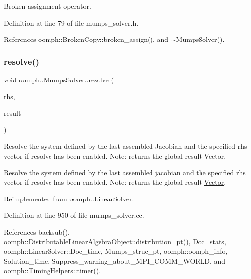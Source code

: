 Broken assignment operator. 



Definition at line 79 of file mumps\+\_\+solver.\+h.



References oomph\+::\+Broken\+Copy\+::broken\+\_\+assign(), and $\sim$\+Mumps\+Solver().

\mbox{\label{classoomph_1_1MumpsSolver_a849d13cac2177452446c2ec387a0260f}} 
\subsubsection{\texorpdfstring{resolve()}{resolve()}}
{\footnotesize\ttfamily void oomph\+::\+Mumps\+Solver\+::resolve (\begin{DoxyParamCaption}\item[{const \hyperlink{classoomph_1_1DoubleVector}{Double\+Vector} \&}]{rhs,  }\item[{\hyperlink{classoomph_1_1DoubleVector}{Double\+Vector} \&}]{result }\end{DoxyParamCaption})\hspace{0.3cm}{\ttfamily [virtual]}}



Resolve the system defined by the last assembled Jacobian and the specified rhs vector if resolve has been enabled. Note\+: returns the global result \hyperlink{classoomph_1_1Vector}{Vector}. 

Resolve the system defined by the last assembled jacobian and the specified rhs vector if resolve has been enabled. Note\+: returns the global result \hyperlink{classoomph_1_1Vector}{Vector}. 

Reimplemented from \hyperlink{classoomph_1_1LinearSolver_a3b310d08333033edc119b2a5bd7dcbfb}{oomph\+::\+Linear\+Solver}.



Definition at line 950 of file mumps\+\_\+solver.\+cc.



References backsub(), oomph\+::\+Distributable\+Linear\+Algebra\+Object\+::distribution\+\_\+pt(), Doc\+\_\+stats, oomph\+::\+Linear\+Solver\+::\+Doc\+\_\+time, Mumps\+\_\+struc\+\_\+pt, oomph\+::oomph\+\_\+info, Solution\+\_\+time, Suppress\+\_\+warning\+\_\+about\+\_\+\+M\+P\+I\+\_\+\+C\+O\+M\+M\+\_\+\+W\+O\+R\+LD, and oomph\+::\+Timing\+Helpers\+::timer().



